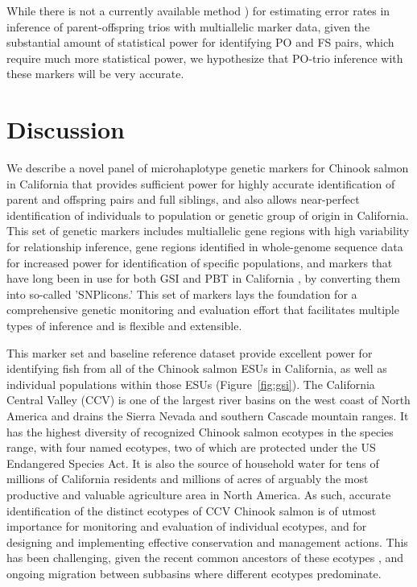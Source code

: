 While there is not a currently available method \citep[like that of][]{anderson2006power}) for estimating error rates in
inference of parent-offspring trios with multiallelic marker data, given the substantial amount of statistical power for identifying
PO and FS pairs, which 
require much more statistical power, we hypothesize that PO-trio inference with these markers will be very accurate.








\section*{Discussion}

We describe a novel panel of microhaplotype genetic markers for Chinook salmon
in California that provides sufficient power for highly accurate identification 
of parent and offspring pairs and full siblings, and also allows near-perfect
identification of individuals to population or genetic group of origin in California. 
This set of genetic markers includes multiallelic gene regions with high variability for
relationship inference, gene regions identified in whole-genome sequence data
for increased power for identification of specific populations, and markers that have
long been in use for both GSI and PBT in California \citep{clemento2014evaluation}, by converting them
into so-called 'SNPlicons.' This set of markers lays the foundation for a comprehensive 
genetic monitoring and evaluation effort that facilitates multiple types of inference 
and is flexible and extensible.


This marker set and baseline reference dataset provide
excellent power for identifying fish from all of the Chinook salmon ESUs in California,
as well as individual populations within those ESUs (Figure~\ref{fig:gsi}).
The California Central Valley (CCV) is one of the largest river
basins on the west coast of North America and drains the Sierra Nevada and southern Cascade
mountain ranges. It has the highest diversity of recognized Chinook salmon
ecotypes in the species range, with four named ecotypes, two of which are protected
under the US Endangered Species Act. It is also the source of household water for
tens of millions of California residents and millions of acres of arguably
the most productive and valuable agriculture area in North America. As such, accurate identification of the distinct 
ecotypes of CCV Chinook salmon is of utmost importance for monitoring and
evaluation of individual ecotypes, and for designing and implementing
effective conservation and management actions. This has been challenging,
given the recent common ancestors of these ecotypes \citep{clemento2014evaluation}, and
ongoing migration between subbasins where different ecotypes predominate.

